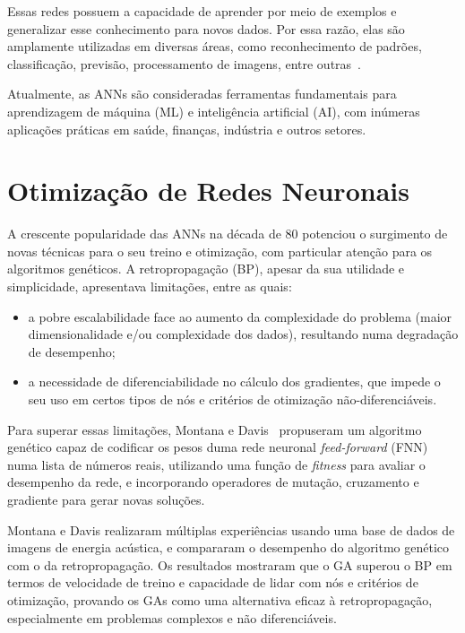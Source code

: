 \documentclass[a4paper, portuguese]{report}
\begin{document}
Essas redes possuem a capacidade de aprender por meio de exemplos e generalizar esse conhecimento para novos dados. Por essa razão, elas são amplamente utilizadas em diversas áreas, como reconhecimento de padrões, classificação, previsão, processamento de imagens, entre outras~\cite{Jain1996ArtificialTutorial}.

Atualmente, as ANNs são consideradas ferramentas fundamentais para aprendizagem de máquina (ML) e inteligência artificial (AI), com inúmeras aplicações práticas em saúde, finanças, indústria e outros setores.

\section{Otimização de Redes Neuronais}\label{sec:optim_nns}

A crescente popularidade das ANNs na década de 80 potenciou o surgimento de novas técnicas para o seu treino e otimização, com particular atenção para os algoritmos genéticos. A retropropagação (BP), apesar da sua utilidade e simplicidade, apresentava limitações, entre as quais:
\begin{itemize}
    \item a pobre escalabilidade face ao aumento da complexidade do problema (maior dimensionalidade e/ou complexidade dos dados), resultando numa degradação de desempenho;
    \item a necessidade de diferenciabilidade no cálculo dos gradientes, que impede o seu uso em certos tipos de nós e critérios de otimização não-diferenciáveis.
\end{itemize}

Para superar essas limitações, Montana e Davis~\cite{Montana1989} propuseram um algoritmo genético capaz de codificar os pesos duma rede neuronal \textit{feed-forward} (FNN) numa lista de números reais, utilizando uma função de \textit{fitness} para avaliar o desempenho da rede, e incorporando operadores de mutação, cruzamento e gradiente para gerar novas soluções. 

Montana e Davis realizaram múltiplas experiências usando uma base de dados de imagens de energia acústica, e compararam o desempenho do algoritmo genético com o da retropropagação. Os resultados mostraram que o GA superou o BP em termos de velocidade de treino e capacidade de lidar com nós e critérios de otimização, provando os GAs como uma alternativa eficaz à retropropagação, especialmente em problemas complexos e não diferenciáveis.
\end{document}
